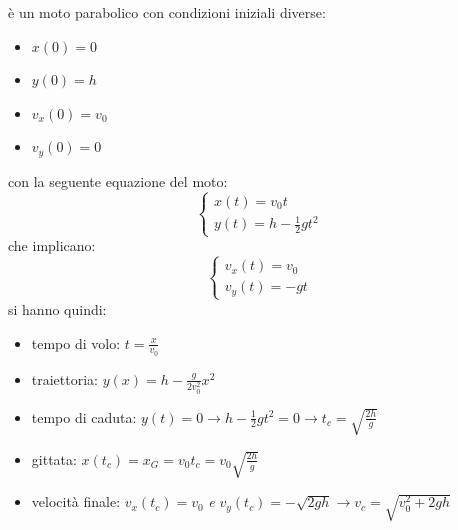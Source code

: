 \documentclass[a4paper,12pt, oneside]{book}
\begin{document}
è un moto parabolico con condizioni iniziali diverse:
\begin{itemize}
\item $x(0)=0$
\item $y(0)=h$
\item $v_x(0)=v_0$
\item $v_y(0)=0$
\end{itemize}
con la seguente equazione  del moto:
$$\begin{cases}
x(t)=v_0t\\
y(t)=h-\frac{1}{2}gt^2
\end{cases}$$
che implicano:
$$\begin{cases}
v_x(t)=v_0\\
v_y(t)=-gt
\end{cases}$$
si hanno quindi:
\begin{itemize}
\item tempo di volo: $t=\frac{x}{v_0}$
\item traiettoria: $y(x)=h-\frac{g}{2v_0^2}x^2$
\item tempo di caduta: $y(t)=0\to h-\frac{1}{2}gt^2=0\to t_c=\sqrt{\frac{2h}{g}}$
\item gittata: $x(t_c)=x_G=v_0t_c=v_0\sqrt{\frac{2h}{g}}$
\item velocità finale: $v_x(t_c)=v_0$ \textit{e} $v_y(t_c)=-\sqrt{2gh}\to v_c=\sqrt{v_0^2+2gh}$
\end{itemize}
\end{document}

